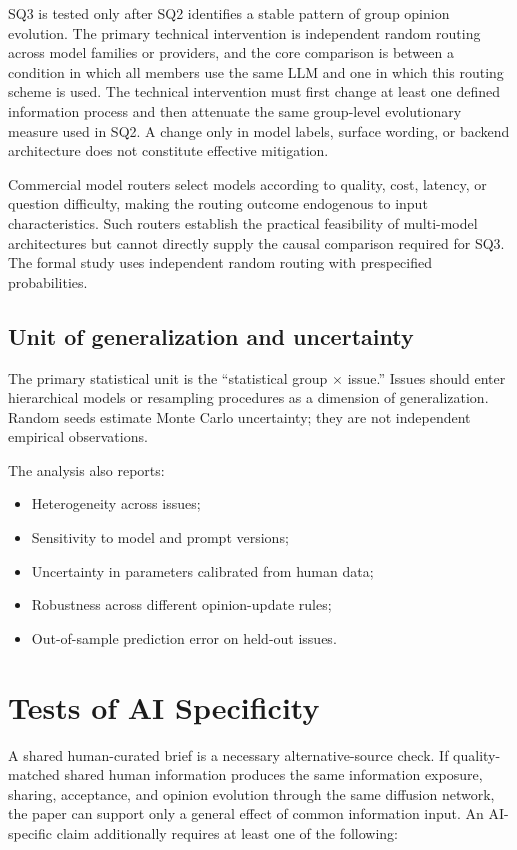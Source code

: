 \documentclass[11pt,a4paper]{article}
\begin{document}
SQ3 is tested only after SQ2 identifies a stable pattern of group opinion evolution. The primary technical intervention is independent random routing across model families or providers, and the core comparison is between a condition in which all members use the same LLM and one in which this routing scheme is used. The technical intervention must first change at least one defined information process and then attenuate the same group-level evolutionary measure used in SQ2. A change only in model labels, surface wording, or backend architecture does not constitute effective mitigation.

Commercial model routers select models according to quality, cost, latency, or question difficulty, making the routing outcome endogenous to input characteristics. Such routers establish the practical feasibility of multi-model architectures but cannot directly supply the causal comparison required for SQ3. The formal study uses independent random routing with prespecified probabilities.

\subsection{Unit of generalization and uncertainty}

The primary statistical unit is the ``statistical group $\times$ issue.'' Issues should enter hierarchical models or resampling procedures as a dimension of generalization. Random seeds estimate Monte Carlo uncertainty; they are not independent empirical observations.

The analysis also reports:

\begin{itemize}
\item Heterogeneity across issues;
\item Sensitivity to model and prompt versions;
\item Uncertainty in parameters calibrated from human data;
\item Robustness across different opinion-update rules;
\item Out-of-sample prediction error on held-out issues.
\end{itemize}

\section{Tests of AI Specificity}

A shared human-curated brief is a necessary alternative-source check. If quality-matched shared human information produces the same information exposure, sharing, acceptance, and opinion evolution through the same diffusion network, the paper can support only a general effect of common information input. An AI-specific claim additionally requires at least one of the following:
\end{document}

